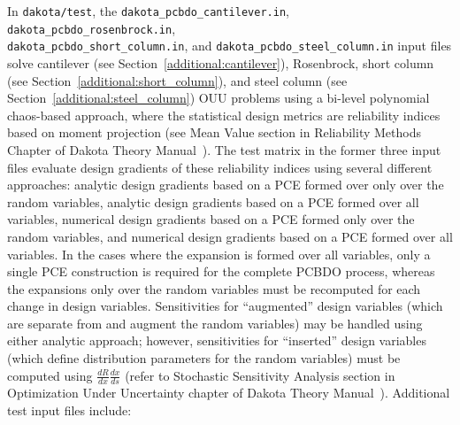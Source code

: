 In \texttt{dakota/test}, the \texttt{dakota\_pcbdo\_cantilever.in},
\texttt{dakota\_pcbdo\_rosenbrock.in},\\
\texttt{dakota\_pcbdo\_short\_column.in}, and
\texttt{dakota\_pcbdo\_steel\_column.in} input files solve cantilever
(see Section~\ref{additional:cantilever}), Rosenbrock, short column
(see Section~\ref{additional:short_column}), and steel column (see
Section~\ref{additional:steel_column}) OUU problems using a bi-level
polynomial chaos-based approach, where the statistical design metrics
are reliability indices based on moment projection (see Mean Value
section in Reliability Methods Chapter of Dakota Theory
Manual~\cite{TheoMan}). The test matrix in the former three input
files evaluate design gradients of these reliability indices using
several different approaches: analytic design gradients based on a PCE
formed over only over the random variables, analytic design gradients
based on a PCE formed over all variables, numerical design gradients
based on a PCE formed only over the random variables, and numerical
design gradients based on a PCE formed over all variables. In the
cases where the expansion is formed over all variables, only a single
PCE construction is required for the complete PCBDO process, whereas
the expansions only over the random variables must be recomputed for
each change in design variables. Sensitivities for ``augmented''
design variables (which are separate from and augment the random
variables) may be handled using either analytic approach; however,
sensitivities for ``inserted'' design variables (which define
distribution parameters for the random variables) must be 
computed using $\frac{dR}{dx} \frac{dx}{ds}$ (refer to Stochastic
Sensitivity Analysis section in Optimization Under Uncertainty chapter
of Dakota Theory Manual~\cite{TheoMan}). Additional test input files
include:
